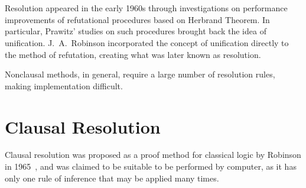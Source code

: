 \section{}
Resolution appeared in the early 1960s through investigations on performance
improvements of refutational procedures based on Herbrand Theorem. In
particular, Prawitz' studies on such procedures brought back the idea of
unification. J.~A.~Robinson incorporated the concept of unification directly to the
method of refutation, creating what was later known as resolution. 

Nonclausal methods, in general, require a large number of resolution rules,
making implementation difficult.

\section{Clausal Resolution}

Clausal resolution was proposed as a proof method for classical logic by
Robinson in 1965~\cite{Robinson65}, and was claimed to be suitable to be performed
by computer, as it has only one rule of inference that may be applied many
times.
